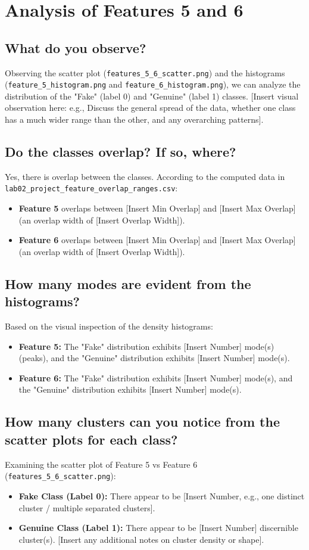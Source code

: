 \section*{Analysis of Features 5 and 6}

\subsection*{What do you observe?}
Observing the scatter plot (\texttt{features\_5\_6\_scatter.png}) and the histograms (\texttt{feature\_5\_histogram.png} and \texttt{feature\_6\_histogram.png}), we can analyze the distribution of the "Fake" (label 0) and "Genuine" (label 1) classes. [Insert visual observation here: e.g., Discuss the general spread of the data, whether one class has a much wider range than the other, and any overarching patterns].

\subsection*{Do the classes overlap? If so, where?}
Yes, there is overlap between the classes. According to the computed data in \texttt{lab02\_project\_feature\_overlap\_ranges.csv}:
\begin{itemize}
    \item \textbf{Feature 5} overlaps between [Insert Min Overlap] and [Insert Max Overlap] (an overlap width of [Insert Overlap Width]).
    \item \textbf{Feature 6} overlaps between [Insert Min Overlap] and [Insert Max Overlap] (an overlap width of [Insert Overlap Width]).
\end{itemize}

\subsection*{How many modes are evident from the histograms?}
Based on the visual inspection of the density histograms:
\begin{itemize}
    \item \textbf{Feature 5:} The "Fake" distribution exhibits [Insert Number] mode(s) (peaks), and the "Genuine" distribution exhibits [Insert Number] mode(s).
    \item \textbf{Feature 6:} The "Fake" distribution exhibits [Insert Number] mode(s), and the "Genuine" distribution exhibits [Insert Number] mode(s).
\end{itemize}

\subsection*{How many clusters can you notice from the scatter plots for each class?}
Examining the scatter plot of Feature 5 vs Feature 6 (\texttt{features\_5\_6\_scatter.png}):
\begin{itemize}
    \item \textbf{Fake Class (Label 0):} There appear to be [Insert Number, e.g., one distinct cluster / multiple separated clusters].
    \item \textbf{Genuine Class (Label 1):} There appear to be [Insert Number] discernible cluster(s). [Insert any additional notes on cluster density or shape].
\end{itemize}
